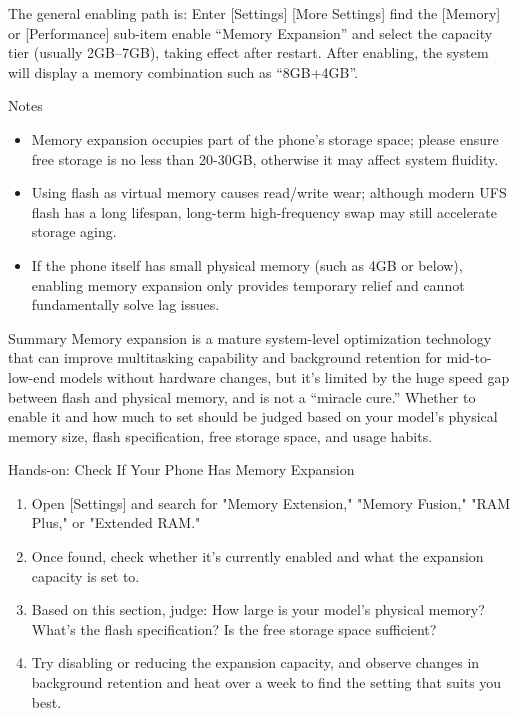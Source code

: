 The general enabling path is: Enter [Settings] [More Settings] find the [Memory] or [Performance] sub-item enable “Memory Expansion” and select the capacity tier (usually 2GB–7GB), taking effect after restart. After enabling, the system will display a memory combination such as “8GB+4GB”.

\begin{tcbwarn}{Notes}
\begin{itemize}
  \item Memory expansion occupies part of the phone's storage space; please ensure free storage is no less than 20-30GB, otherwise it may affect system fluidity.
  \item Using flash as virtual memory causes read/write wear; although modern UFS flash has a long lifespan, long-term high-frequency swap may still accelerate storage aging.
  \item If the phone itself has small physical memory (such as 4GB or below), enabling memory expansion only provides temporary relief and cannot fundamentally solve lag issues.
\end{itemize}

\end{tcbwarn}

\begin{tcbinfo}{Summary}
Memory expansion is a mature system-level optimization technology that can improve multitasking capability and background retention for mid-to-low-end models without hardware changes, but it's limited by the huge speed gap between flash and physical memory, and is not a “miracle cure.” Whether to enable it and how much to set should be judged based on your model's physical memory size, flash specification, free storage space, and usage habits.

\end{tcbinfo}

\begin{tcbpractice}{Hands-on: Check If Your Phone Has Memory Expansion}
\begin{enumerate}
  \item Open [Settings] and search for "Memory Extension," "Memory Fusion," "RAM Plus," or "Extended RAM."
  \item Once found, check whether it's currently enabled and what the expansion capacity is set to.
  \item Based on this section, judge: How large is your model's physical memory? What's the flash specification? Is the free storage space sufficient?
  \item Try disabling or reducing the expansion capacity, and observe changes in background retention and heat over a week to find the setting that suits you best.
\end{enumerate}

\end{tcbpractice}

